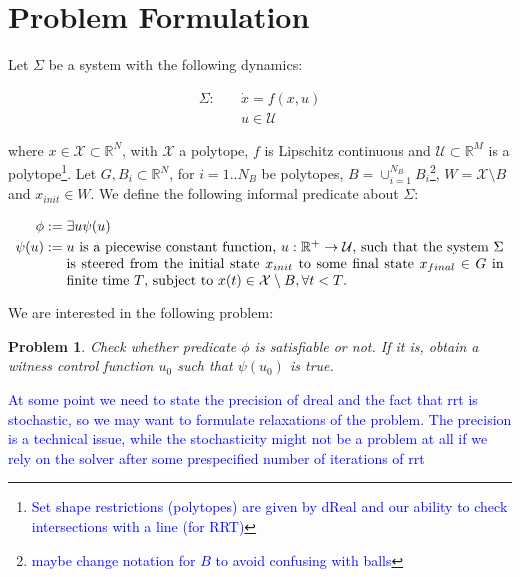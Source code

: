\documentclass[12pt]{article}
\newtheorem{problem}{Problem}
\newcommand\fran[1]{\textcolor{blue}{#1}}
\newcommand\ffran[1]{\textcolor{blue}{\footnote{\fran{#1}}}}
\begin{document}
\section{Problem Formulation}
\label{sec:problem_formulation}

Let $\Sigma$ be a system with the following dynamics:

\begin{equation}
    \label{eq:sigma}
    \begin{split}
        \Sigma : \quad &\dot x = f(x, u) \\
                       &u \in \mathcal{U}
    \end{split}
\end{equation}

where $x \in \mathcal{X} \subset \mathbb{R}^N$, with $\mathcal{X}$ a polytope, $f$ is Lipschitz continuous and $\mathcal{U} \subset \mathbb{R}^M$ is a polytope\ffran{Set shape restrictions (polytopes) are given by dReal and our ability to check intersections with a line (for RRT)}. Let $G, B_i \subset \mathbb{R}^N$, for $i = 1..N_B$ be polytopes, $B = \cup_{i=1}^{N_B} B_i$\ffran{maybe change notation for $B$ to avoid confusing with balls}, $W = \mathcal{X} \setminus B$ and $x_{init} \in W$. We define the following informal predicate about $\Sigma$:

\begin{equation}
    \begin{split}
        \phi &:= \exists u \psi (u) \\
        \psi(u) &:=  \parbox[t]{11cm}{$u$ is a piecewise constant function, $u : \mathbb{R}^+ \rightarrow \mathcal{U}$, such that the system $\Sigma$ is steered from the initial state $x_{init}$ to some final state $x_{final} \in G$ in finite time $T$, subject to $x(t) \in \mathcal{X} \setminus B, \forall t < T$.}
    \end{split}
\end{equation}

We are interested in the following problem:

\begin{problem}\label{pr:reach}
    Check whether predicate $\phi$ is satisfiable or not. If it is, obtain a witness control function $u_0$ such that $\psi(u_0)$ is true.
\end{problem}

\fran{At some point we need to state the precision of dreal and the fact that rrt is stochastic, so we may want to formulate relaxations of the problem. The precision is a technical issue, while the stochasticity might not be a problem at all if we rely on the solver after some prespecified number of iterations of rrt}
\end{document}
